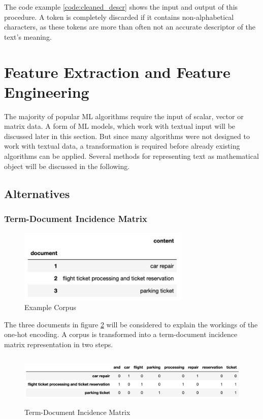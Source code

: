 	 The code example \ref{code:cleaned_descr} shows the input and output of this procedure. A token is completely discarded if it contains non-alphabetical characters, as these tokens are more than often not an accurate descriptor of the text's meaning.	

        
        \section{Feature Extraction and Feature Engineering}
        The majority of popular \ac{ML} algorithms require the input of scalar, vector or matrix data. A form of \ac{ML} models, which work with textual input will be discussed later in this section. 
        But since many algorithms were not designed to work with textual data, a transformation is required before already existing algorithms can be applied. Several methods for representing text as mathematical object will be discussed in the following.
    
            \subsection{Alternatives}
            \subsubsection{Term-Document Incidence Matrix}

            \begin{figure}[h]
            	\centering
            	 \includegraphics[height=3.5cm]{Bilder/corpus_bow.png}
            	\caption{Example Corpus}
            	\label{fig:corpus}
            \end{figure}
            The three documents in figure \ref{fig:corpus} will be considered to explain the workings of the one-hot encoding. A corpus is transformed into a term-document incidence matrix representation in two steps. 
            
            \begin{figure}[h!]
            	\centering
            	\includegraphics[height=2.5cm]{Bilder/preprocessing/term-document-incidence.png}
            	\caption{Term-Document Incidence Matrix}
            	\label{fig:corpus}
            \end{figure}
            
